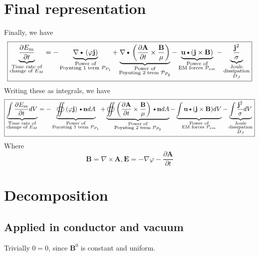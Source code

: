 \documentclass[11pt]{article}
\newcommand{\A}{\mathbf{A}}
\newcommand{\B}{\mathbf{B}}
\newcommand{\PD}{\partial}
\newcommand{\BM}{\frac{\mathbf{B}}{\mu}}
\newcommand{\J}{\mathbf{j}}
\newcommand{\E}{\mathbf{E}}
\newcommand{\N}{\mathbf{n}}
\newcommand{\JSS}{\frac{\mathbf{j}^2}{\sigma}}
\renewcommand{\U}{\mathbf{u}}
\newcommand{\DOT}{\text{\textbullet}}
\begin{document}
\section{Final representation}
Finally, we have
\begin{equation}
	\boxed{
	\underbrace{\frac{\PD E_m}{\PD t} }_
	{\substack{\text{Time rate of}\\\text{change of $E_M$}}}
	=
	- \underbrace{\nabla \DOT \left(\varphi \J \right) }_
	{\substack{\text{Power of}\\\text{Poynting 1 term $\mathcal P_{P_1}$}}}
	+ \underbrace{\nabla \DOT \left( \frac{\PD \A}{\PD t} \times \BM \right)}_
	{\substack{\text{Power of}\\\text{Poynting 2 term $\mathcal P_{P_2}$}}}
	- \underbrace{\U \DOT (\J \times \B)}_
	{\substack{\text{Power of}\\\text{EM forces $\mathcal P_{em}$}}}
	- \underbrace{\JSS}_
	{\substack{\text{Joule}\\\text{dissipation}\\\text{$D_J$}}}
	}
\end{equation}
Writing these as integrals, we have
\begin{equation}
	\boxed{
	\underbrace{\int \frac{\PD E_m}{\PD t} dV}_
	{\substack{\text{Time rate of}\\\text{change of $E_M$}}}
	=
	- \underbrace{\oiint \left(\varphi \J \right) \DOT \N dA }_
	{\substack{\text{Power of}\\\text{Poynting 1 term $\mathcal P_{P_1}$}}}
	+ \underbrace{\oiint \left( \frac{\PD \A}{\PD t} \times \BM \right)\DOT \N dA }_
	{\substack{\text{Power of}\\\text{Poynting 2 term $\mathcal P_{P_2}$}}}
	- \underbrace{\int \U \DOT (\J \times \B) dV}_
	{\substack{\text{Power of}\\\text{EM forces $\mathcal P_{em}$}}}
	- \underbrace{\int \JSS dV}_
	{\substack{\text{Joule}\\\text{dissipation}\\\text{$D_J$}}}
	}
\end{equation}
Where
\begin{equation}
	\B = \nabla \times \A, \E = - \nabla \varphi - \frac{\PD \A}{\PD t}
\end{equation}
\section{Decomposition}
\subsection{Applied in conductor and vacuum}
Trivially $0 = 0$, since $\B^0$ is constant and uniform.
\end{document}
